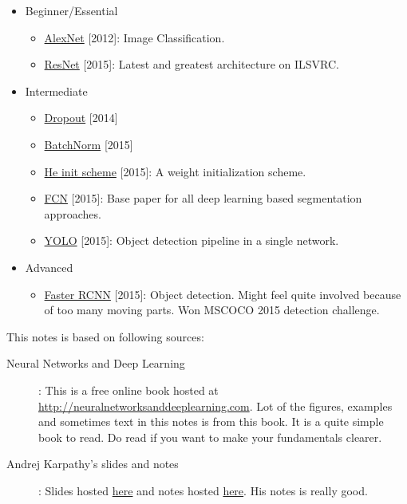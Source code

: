 \documentclass[a4paper]{tufte-handout}
\begin{document}
\begin{itemize}
	\item Beginner/Essential
		\begin{itemize}
			\item \href{https://papers.nips.cc/paper/4824-imagenet-classification-with-deep-convolutional-neural-networks}{AlexNet} [2012]: Image Classification.
			\item \href{https://arxiv.org/abs/1512.03385}{ResNet} [2015]: Latest and greatest architecture on ILSVRC.
		\end{itemize}
		
	\item Intermediate
		\begin{itemize}
			\item \href{https://www.cs.toronto.edu/~hinton/absps/JMLRdropout.pdf}{Dropout} [2014]
			\item \href{https://arxiv.org/abs/1502.03167}{BatchNorm} [2015]
			\item \href{https://arxiv.org/abs/1502.01852}{He init scheme} [2015]: A weight initialization scheme.
			\item \href{http://www.cv-foundation.org/openaccess/content_cvpr_2015/papers/Long_Fully_Convolutional_Networks_2015_CVPR_paper.pdf}{FCN} [2015]: Base paper for all deep learning based segmentation approaches.
			\item \href{https://arxiv.org/abs/1506.02640}{YOLO} [2015]: Object detection pipeline in a single network.
		\end{itemize}
	\item Advanced
		\begin{itemize}
			\item \href{https://arxiv.org/abs/1506.01497}{Faster RCNN} [2015]: Object detection. Might feel quite involved because of too many moving parts. Won MSCOCO 2015 detection challenge.
		\end{itemize}
\end{itemize}


This notes is based on following sources:
\begin{description}
\item[Neural Networks and Deep Learning]: This is a free online book hosted at \url{http://neuralnetworksanddeeplearning.com}. Lot of the figures, examples and sometimes text in this notes is from this book. It is a quite simple book to read. Do read if you want to make your fundamentals clearer.
\item[Andrej Karpathy's slides and notes]: Slides hosted \href{https://docs.google.com/presentation/d/1Q1CmVVnjVJM_9CDk3B8Y6MWCavZOtiKmOLQ0XB7s9Vg/edit?usp=sharing}{here} and notes hosted \href{http://cs231n.github.io}{here}. His notes is really good.
\end{description}
\end{document}
